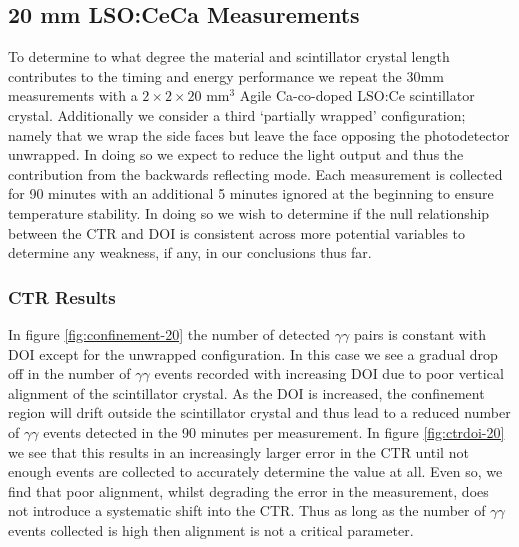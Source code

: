\subsection{20 mm LSO:CeCa Measurements}
\label{sec:20mm}

To determine to what degree the material and scintillator crystal length contributes to the timing and energy performance we repeat the 30mm measurements with a $2\times2\times20$ mm$^3$ Agile Ca-co-doped LSO:Ce scintillator crystal. Additionally we consider a third `partially wrapped' configuration; namely that we wrap the side faces but leave the face opposing the photodetector unwrapped. In doing so we expect to reduce the light output and thus the contribution from the backwards reflecting mode. Each measurement is collected for 90 minutes with an additional 5 minutes ignored at the beginning to ensure temperature stability. In doing so we wish to determine if the null relationship between the CTR and DOI is consistent across more potential variables  to determine any weakness, if any, in our conclusions thus far.

\subsubsection{CTR Results}
In figure \ref{fig:confinement-20} the number of detected $\gamma\gamma$ pairs is constant with DOI except for the unwrapped configuration. In this case we see a gradual drop off in the number of $\gamma\gamma$ events recorded with increasing DOI due to poor vertical alignment of the scintillator crystal. As the DOI is increased, the confinement region will drift outside the scintillator crystal and thus lead to a reduced number of $\gamma\gamma$ events detected in the 90 minutes per measurement. In figure \ref{fig:ctrdoi-20} we see that this results in an increasingly larger error in the CTR until not enough events are collected to accurately determine the value at all. Even so, we find that poor alignment, whilst degrading the error in the measurement, does not introduce a systematic shift into the CTR. Thus as long as the number of $\gamma\gamma$ events collected is high then alignment is not a critical parameter. 
